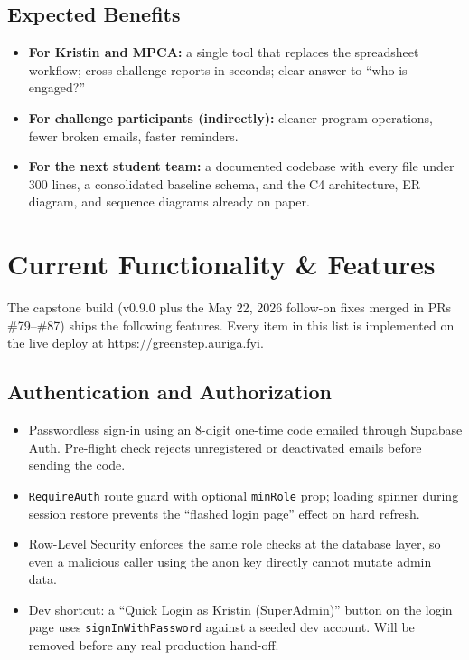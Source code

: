 \documentclass[11pt,letterpaper]{article}
\begin{document}
\subsection{Expected Benefits}

\begin{itemize}[noitemsep]
  \item \textbf{For Kristin and MPCA:} a single tool that replaces
        the spreadsheet workflow; cross-challenge reports in seconds;
        clear answer to ``who is engaged?''
  \item \textbf{For challenge participants (indirectly):} cleaner
        program operations, fewer broken emails, faster reminders.
  \item \textbf{For the next student team:} a documented codebase with
        every file under 300 lines, a consolidated baseline schema,
        and the C4 architecture, ER diagram, and sequence diagrams
        already on paper.
\end{itemize}

\newpage

\section{Current Functionality \& Features}

The capstone build (v0.9.0 plus the May 22, 2026 follow-on fixes
merged in PRs \#79--\#87) ships the following features. Every item
in this list is implemented on the live deploy at
\url{https://greenstep.auriga.fyi}.

\subsection{Authentication and Authorization}

\begin{itemize}[noitemsep]
  \item Passwordless sign-in using an 8-digit one-time code emailed
        through Supabase Auth. Pre-flight check rejects unregistered
        or deactivated emails before sending the code.
  \item \texttt{RequireAuth} route guard with optional \texttt{minRole}
        prop; loading spinner during session restore prevents the
        ``flashed login page'' effect on hard refresh.
  \item Row-Level Security enforces the same role checks at the
        database layer, so even a malicious caller using the anon
        key directly cannot mutate admin data.
  \item Dev shortcut: a ``Quick Login as Kristin (SuperAdmin)''
        button on the login page uses \texttt{signInWithPassword}
        against a seeded dev account. Will be removed before any
        real production hand-off.
\end{itemize}
\end{document}
